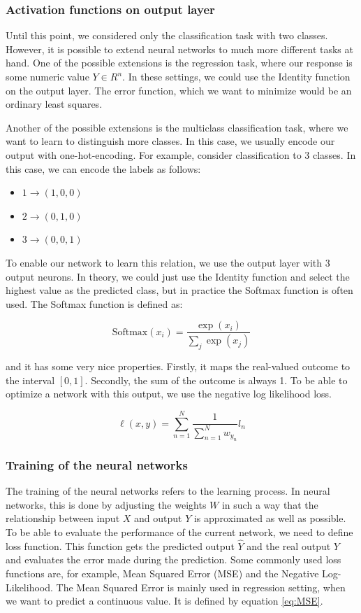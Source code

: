\subsubsection{Activation functions on output layer}
Until this point, we considered only the classification task with two classes.
However, it is possible to extend neural networks to much more different tasks at hand.
One of the possible extensions is the regression task, where our response is some numeric value $Y \in R^n$.
In these settings, we could use the Identity function on the output layer.
The error function, which we want to minimize would be an ordinary least squares. 

Another of the possible extensions is the multiclass classification task, where we want to learn to distinguish more classes.
In this case, we usually encode our output with one-hot-encoding.
For example, consider classification to 3 classes.
In this case, we can encode the labels as follows:
\begin{itemize}
    \item $1 \to (1, 0, 0)$ 
    \item $2 \to (0, 1, 0)$
    \item $3 \to (0, 0, 1)$
\end{itemize}
To enable our network to learn this relation, we use the output layer with 3 output neurons.
In theory, we could just use the Identity function and select the highest value as the predicted class, but in practice the Softmax function is often used.
The Softmax function is defined as:

\begin{equation}
    \text{Softmax}(x_{i}) = \frac{\exp(x_i)}{\sum_j \exp(x_j)}
\end{equation}

and it has some very nice properties.
Firstly, it maps the real-valued outcome to the interval $[0, 1]$.
Secondly, the sum of the outcome is always 1.
To be able to optimize a network with this output, we use the negative log likelihood loss.

\begin{equation}
    \ell(x, y) = \sum_{n=1}^N \frac{1}{\sum_{n=1}^N w_{y_n}} l_n 
\end{equation}

\subsubsection{Training of the neural networks}
The training of the neural networks refers to the learning process.
In neural networks, this is done by adjusting the weights $W$ in such a way that the relationship between input $X$ and output $Y$ is approximated as well as possible.
To be able to evaluate the performance of the current network, we need to define loss function.
This function gets the predicted output $\hat{Y}$ and the real output $Y$ and evaluates the error made during the prediction.
Some commonly used loss functions are, for example, Mean Squared Error (MSE) and the Negative Log-Likelihood.
The Mean Squared Error is mainly used in regression setting, when we want to predict a continuous value.
It is defined by equation \ref{eq:MSE}.

